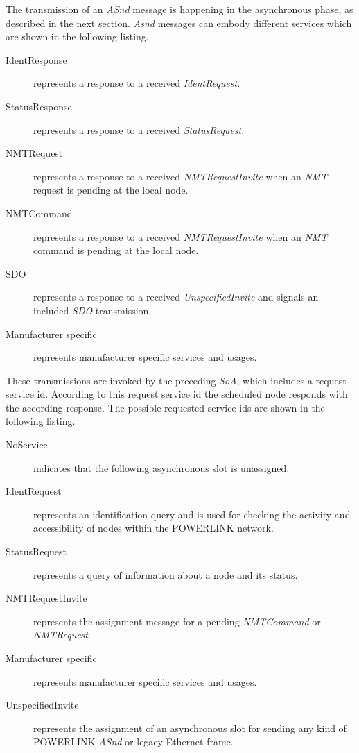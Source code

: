 The transmission of an \emph{ASnd} message is happening in the asynchronous phase, as described in the next section.
\emph{Asnd} messages can embody different services which are shown in the following listing.\cite[section 4.6.1.1.6.1]{epsg_epsg_2013}

\begin{description}
    \item[IdentResponse] represents a response to a received \emph{IdentRequest}.
    \item[StatusResponse] represents a response to a received \emph{StatusRequest}.
    \item[NMTRequest] represents a response to a received \emph{NMTRequestInvite} when an \emph{NMT} request is pending at the local node.
    \item[NMTCommand] represents a response to a received \emph{NMTRequestInvite} when an \emph{NMT} command is pending at the local node.
    \item[SDO] represents a response to a received \emph{UnspecifiedInvite} and signals an included \emph{SDO} transmission.
    \item[Manufacturer specific] represents manufacturer specific services and usages.
\end{description}

These transmissions are invoked by the preceding \emph{SoA}, which includes a request service id.
According to this request service id the scheduled node responds with the according response.
The possible requested service ids are shown in the following listing. \cite[section 4.6.1.1.5.1]{epsg_epsg_2013}

\begin{description}
    \item[NoService] indicates that the following asynchronous slot is unassigned.
    \item[IdentRequest] represents an identification query and is used for checking the activity and accessibility of nodes within the POWERLINK network.
    \item[StatusRequest] represents a query of information about a node and its status.
    \item[NMTRequestInvite] represents the assignment message for a pending \emph{NMTCommand} or \emph{NMTRequest}.
    \item[Manufacturer specific] represents manufacturer specific services and usages.
    \item[UnspecifiedInvite] represents the assignment of an asynchronous slot for sending any kind of POWERLINK \emph{ASnd} or legacy Ethernet frame.
\end{description}

